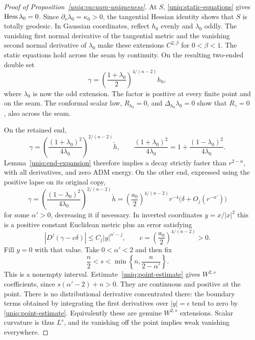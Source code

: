 \begin{proof}[Proof of Proposition~\ref{uniq:vacuum-uniqueness}]
At $S$, \eqref{uniq:static-equations} gives
$\operatorname{Hess}\lambda_0=0$. Since $\partial_\nu\lambda_0=\kappa_0>0$,
the tangential Hessian identity shows that $S$ is totally geodesic.
In Gaussian coordinates, reflect $h_0$ evenly and $\lambda_0$
oddly. The vanishing first normal derivative of the tangential
metric and the vanishing second normal derivative of $\lambda_0$
make these extensions $C^{2,\beta}$ for $0<\beta<1$. The static
equations hold across the seam by continuity. On the resulting
two-ended double set
\begin{equation}\label{uniq:double-metric}
 \gamma=\left(\frac{1+\lambda_0}{2}\right)^{4/(n-2)}h_0,
\end{equation}
where $\lambda_0$ is now the odd extension. The factor is positive
at every finite point and on the seam. The conformal scalar law,
$R_{h_0}=0$, and $\Delta_{h_0}\lambda_0=0$ show that
$R_\gamma=0$, also across the seam.

On the retained end,
\[
 \gamma=
 \left(\frac{(1+\lambda_0)^2}{4\lambda_0}\right)^{2/(n-2)}
      \check h,
 \qquad
 \frac{(1+\lambda_0)^2}{4\lambda_0}
     =1+\frac{(1-\lambda_0)^2}{4\lambda_0}.
\]
Lemma~\ref{uniq:end-expansion} therefore implies a decay strictly
faster than $r^{2-n}$, with all derivatives, and zero ADM energy.
On the other end, expressed using the positive lapse on its original
copy,
\[
 \gamma=
 \left(\frac{(1-\lambda_0)^2}{4\lambda_0}\right)^{2/(n-2)}
       \check h
 =\left(\frac{a_0}{2}\right)^{4/(n-2)}r^{-4}
       \bigl(\delta+O_j(r^{-\alpha'})\bigr)
\]
for some $\alpha'>0$, decreasing it if necessary. In inverted
coordinates $y=x/|x|^2$ this is a positive constant Euclidean
metric plus an error satisfying
\begin{equation}\label{uniq:point-estimate}
 |D^j(\gamma-c\delta)|\leq C_j|y|^{\alpha'-j},
 \qquad c=\left(\frac{a_0}{2}\right)^{4/(n-2)}>0.
\end{equation}
Fill $y=0$ with that value. Take $0<\alpha'<2$ and then fix
\begin{equation}\label{uniq:point-exponent}
 \frac n2<s<\min\left\{n,\frac{n}{2-\alpha'}\right\}.
\end{equation}
This is a nonempty interval. Estimate~\eqref{uniq:point-estimate}
gives $W^{2,s}$ coefficients, since
$s(\alpha'-2)+n>0$. They are continuous and positive at the
point. There is no distributional derivative concentrated there:
the boundary terms obtained by integrating the first derivatives
over $|y|=\epsilon$ tend to zero by
\eqref{uniq:point-estimate}. Equivalently these are genuine
$W^{2,s}$ extensions. Scalar curvature is thus $L^s$, and its
vanishing off the point implies weak vanishing everywhere.


\end{proof}

